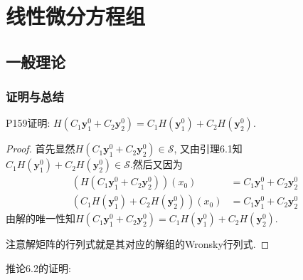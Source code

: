 \chapter{线性微分方程组}



\section{一般理论}



\subsection{证明与总结}



P159证明: $H(C_1\bm{y}_1^0+C_2\bm{y}_2^0)=C_1H(\bm{y}_1^0)+C_2H(\bm{y}_2^0)$.
\begin{proof} 首先显然$H(C_1\bm{y}_1^0+C_2\bm{y}_2^0)\in\mathcal{S}$, 
又由引理6.1知$C_1H(\bm{y}_1^0)+C_2H(\bm{y}_2^0)\in\mathcal{S}$.然后又因为
\[\begin{split}\left(H(C_1\bm{y}_1^0+C_2\bm{y}_2^0)\right)(x_0)&=C_1\bm{y}_1^0+C_2\bm{y}_2^0\\
\left(C_1H(\bm{y}_1^0)+C_2H(\bm{y}_2^0)\right)(x_0)&=C_1\bm{y}_1^0+C_2\bm{y}_2^0
\end{split}\]
由解的唯一性知$H(C_1\bm{y}_1^0+C_2\bm{y}_2^0)=C_1H(\bm{y}_1^0)+C_2H(\bm{y}_2^0)$.

注意解矩阵的行列式就是其对应的解组的Wronsky行列式.
\end{proof}

推论6.2的证明:

